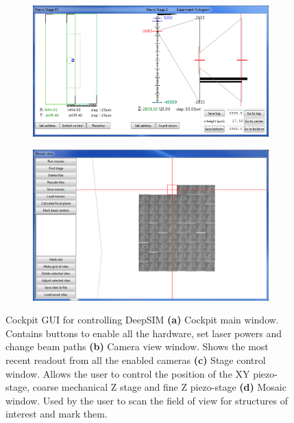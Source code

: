 \begin{figure}[h]
	\begin{subfigure}{0.51\textwidth}
		\centering
		\includegraphics[width=\linewidth]{images/DeepSIM_control_software_stage_control.png}
		\caption{}
		\label{fig:DeepSIM_control_software_stage_control}
	\end{subfigure}
	\begin{subfigure}{0.45\textwidth}
		\centering
		\includegraphics[width=\linewidth]{images/DeepSIM_control_software_mosaic.png}
		\caption{}
		\label{fig:DeepSIM_control_software_mosaic}
	\end{subfigure}
	\caption[Cockpit GUI for controlling DeepSIM]{Cockpit GUI for controlling DeepSIM \textbf{(a)} Cockpit main window. Contains buttons to enable all the hardware, set laser powers and change beam paths \textbf{(b)} Camera view window. Shows the most recent readout from all the enabled cameras \textbf{(c)} Stage control window. Allows the user to control the position of the XY piezo-stage, coarse mechanical Z stage and fine Z piezo-stage \textbf{(d)} Mosaic window. Used by the user to scan the field of view for structures of interest and mark them.}
	\label{fig:Cockpit_UI}
\end{figure}

